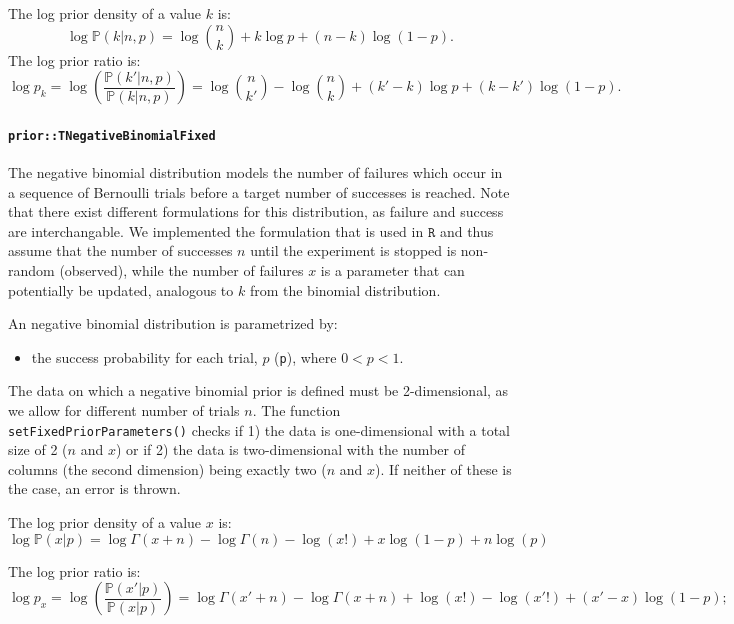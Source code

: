 \documentclass[a4paper,11pt]{article}
\def\p{\mathbb{P}}
\newcommand{\class}[1]{\texttt{#1}}
\newcommand{\privparam}[1]{\texttt{\textunderscore #1}}
\newcommand{\pubfunc}[1]{\texttt{#1()}}
\begin{document}
The log prior density of a value $k$ is:
\begin{equation}\label{eq:priorDensBinomial}
 \log \p(k|n, p) = \log { n \choose k} + k\log p + (n-k) \log (1-p).
\end{equation}
The log prior ratio is:
\begin{equation}\label{eq:priorRatioBinomial}
 \log p_k = \log \left( \frac{\p(k'|n, p)}{\p(k|n, p)} \right) =  \log { n \choose k'} - \log { n \choose k} + (k'-k)\log p + (k-k') \log (1-p).
\end{equation}

\paragraph{\class{prior::TNegativeBinomialFixed}}
The negative binomial distribution models the number of failures which occur in a sequence of Bernoulli trials before a target number of successes is reached. Note that there exist different formulations for this distribution, as failure and success are interchangable. We implemented the formulation that is used in $\texttt{R}$ and thus assume that the number of successes $n$ until the experiment is stopped is non-random (observed), while the number of failures $x$ is a parameter that can potentially be updated, analogous to $k$ from the binomial distribution.

An negative binomial distribution is parametrized by:
\begin{itemize}
 \item the success probability for each trial, $p$ (\privparam{p}), where $0 < p < 1$.
\end{itemize}

The data on which a negative binomial prior is defined must be 2-dimensional, as we allow for different number of trials $n$. The function \pubfunc{setFixedPriorParameters} checks if 1) the data is one-dimensional with a total size of 2 ($n$ and $x$) or if 2) the data is two-dimensional with the number of columns (the second dimension) being exactly two ($n$ and $x$). If neither of these is the case, an error is thrown.

The log prior density of a value $x$ is:
\begin{equation}\label{eq:priorDensNegBinomial}
 \log \p(x|p) = \log \Gamma(x + n) - \log\Gamma(n) - \log(x!) + x \log(1 - p) +
	       n \log(p)
\end{equation}

The log prior ratio is:
\begin{equation}\label{eq:priorRatioNegBinomial}
 \log p_x = \log \left( \frac{\p(x'|p)}{\p(x|p)} \right) = \log \Gamma(x' + n) - \log \Gamma(x + n) + \log(x!) - \log(x'!) + (x' - x) \log(1-p);
\end{equation}
\end{document}
